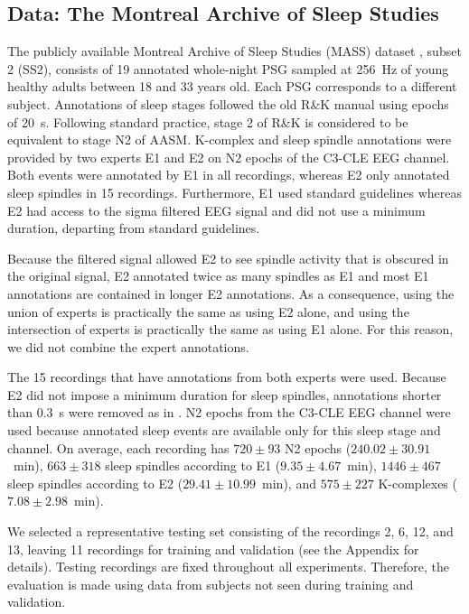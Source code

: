 \documentclass[conference]{IEEEtran}
\begin{document}
\subsection{Data: The Montreal Archive of Sleep Studies}
\label{sec:data_description}

The publicly available Montreal Archive of Sleep Studies (MASS) dataset \cite{o2014montreal}, subset 2 (SS2), consists of 19 annotated whole-night PSG sampled at 256~Hz of young healthy adults between 18 and 33 years old. Each PSG corresponds to a different subject. Annotations of sleep stages followed the old R\&K manual using epochs of 20~s. Following standard practice, stage 2 of R\&K is considered to be equivalent to stage N2 of AASM. K-complex and sleep spindle annotations were provided by two experts E1 and E2 on N2 epochs of the C3-CLE EEG channel. Both events were annotated by E1 in all recordings, whereas E2 only annotated sleep spindles in 15 recordings. Furthermore, E1 used standard guidelines whereas E2 had access to the sigma filtered EEG signal and did not use a minimum duration, departing from standard guidelines. 

Because the filtered signal allowed E2 to see spindle activity that is obscured in the original signal, E2 annotated twice as many spindles as E1 and most E1 annotations are contained in longer E2 annotations. As a consequence, using the union of experts is practically the same as using E2 alone, and using the intersection of experts is practically the same as using E1 alone. For this reason, we did not combine the expert annotations.

The 15 recordings that have annotations from both experts were used. Because E2 did not impose a minimum duration for sleep spindles, annotations shorter than 0.3~s were removed as in \cite{warby2014sleep}. N2 epochs from the C3-CLE EEG channel were used because annotated sleep events are available only for this sleep stage and channel. On average, each recording has $720\pm 93$ N2 epochs ($240.02\pm 30.91$~min), $663\pm 318$ sleep spindles according to E1 ($9.35\pm 4.67$~min), $1446\pm 467$ sleep spindles according to E2 ($29.41\pm 10.99$~min), and $575\pm 227$ K-complexes ($7.08\pm 2.98$~min).

We selected a representative testing set consisting of the recordings 2, 6, 12, and 13, leaving 11 recordings for training and validation (see the Appendix for details). Testing recordings are fixed throughout all experiments. Therefore, the evaluation is made using data from subjects not seen during training and validation.
\end{document}
